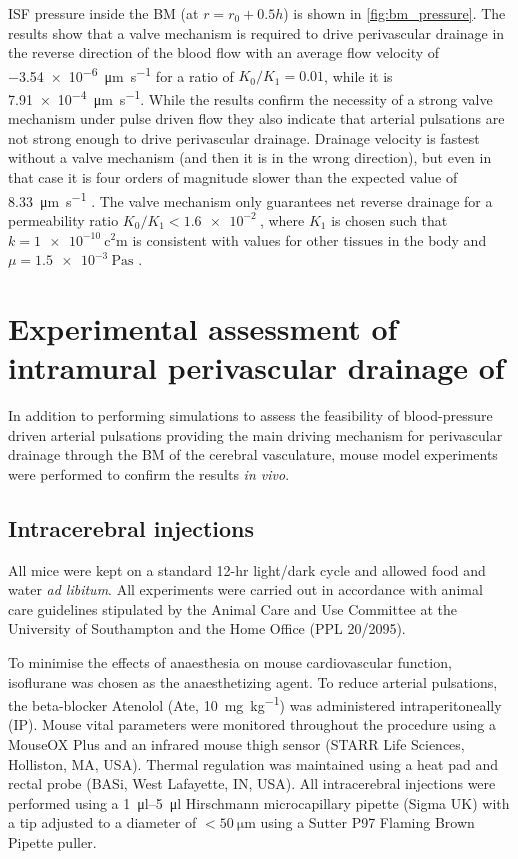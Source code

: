 \documentclass[a4paper,titlepage]{scrartcl}
\begin{document}
ISF pressure inside the BM (at $r = r_0 + 0.5h$) is shown in \autoref{fig:bm_pressure}. The results show that a valve mechanism is required to drive perivascular drainage in the reverse direction of the blood flow with an average flow velocity of \SI{-3.54e-6}{\micro\metre\per\second} for a ratio of $K_0/K_1 = 0.01$, while it is \SI{7.91e-4}{\micro\metre\per\second}. While the results confirm the necessity of a strong valve mechanism under pulse driven flow they also indicate that arterial pulsations are not strong enough to drive perivascular drainage. Drainage velocity is fastest without a valve mechanism (and then it is in the wrong direction), but even in that case it is four orders of magnitude slower than the expected value of \SI{8.33}{\micro\metre\per\second} \cite{Carare2008}. The valve mechanism only guarantees net reverse drainage for a permeability ratio $K_0/K_1 < \SI{1.6e-2}{}$, where $K_1$ is chosen such that $k = \SI{1e-10}{\square\centi\metre}$ is consistent with values for other tissues in the body and $\mu = \SI{1.5e-3}{\pascal\second}$ \cite{Heppell2013}.


\section{Experimental assessment of intramural perivascular drainage of \Ab}

In addition to performing simulations to assess the feasibility of blood-pressure driven arterial pulsations providing the main driving mechanism for perivascular drainage through the BM of the cerebral vasculature, mouse model experiments were performed to confirm the results \textit{in vivo}.


\subsection{Intracerebral injections}

All mice were kept on a standard 12-hr light/dark cycle and allowed food and water \textit{ad libitum}. All experiments were carried out in accordance with animal care guidelines stipulated by the Animal Care and Use Committee at the University of Southampton and the Home Office (PPL 20/2095).

To minimise the effects of anaesthesia on mouse cardiovascular function, isoflurane was chosen as the anaesthetizing agent. To reduce arterial pulsations, the beta-blocker Atenolol (Ate, \SI{10}{\milli\gram\per\kilo\gram}) was administered intraperitoneally (IP). Mouse vital parameters were monitored throughout the procedure using a MouseOX Plus and an infrared mouse thigh sensor (STARR Life Sciences, Holliston, MA, USA). Thermal regulation was maintained using a heat pad and rectal probe (BASi, West Lafayette, IN, USA). All intracerebral injections were performed using a \SIrange{1}{5}{\micro\litre} Hirschmann microcapillary pipette (Sigma UK) with a tip adjusted to a diameter of $< \SI{50}{\micro\metre}$ using a Sutter P97 Flaming Brown Pipette puller.
\end{document}
